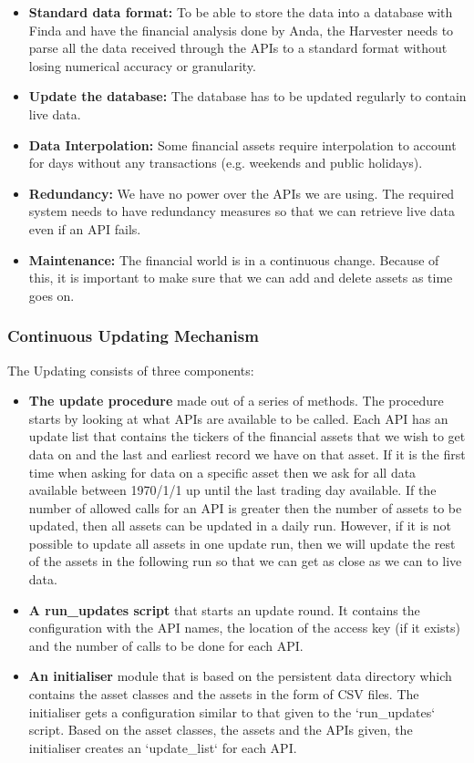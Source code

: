 \documentclass[main.tex]{subfiles}
\begin{document}
\begin{itemize}
    \item \textbf{Standard data format:} To be able to store the data into a database with Finda and have the financial analysis done by Anda, the Harvester needs to parse all the data received through the APIs to a standard format without losing numerical accuracy or granularity.
    \item \textbf{Update the database:} The database has to be updated regularly to contain live data.
    \item \textbf{Data Interpolation:} Some financial assets require interpolation to account for days without any transactions (e.g. weekends and public holidays).
    \item \textbf{Redundancy:} We have no power over the APIs we are using. The required system needs to have redundancy measures so that we can retrieve live data even if an API fails.
    \item \textbf{Maintenance:} The financial world is in a continuous change. Because of this, it is important to make sure that we can add and delete assets as time goes on.
\end{itemize}

\subsubsection{Continuous Updating Mechanism}
The Updating consists of three components:
\begin{itemize}
    \item \textbf{The update procedure} made out of a series of methods. The procedure starts by looking at what APIs are available to be called. Each API has an update list that contains the tickers of the financial assets that we wish to get data on and the last and earliest record we have on that asset. If it is the first time when asking for data on a specific asset then we ask for all data available between 1970/1/1 up until the last trading day available. If the number of allowed calls for an API is greater then the number of assets to be updated, then all assets can be updated in a daily run. However, if it is not possible to update all assets in one update run, then we will update the rest of the assets in the following run so that we can get as close as we can to live data.
    \item \textbf{A run\_updates script} that starts an update round. It contains the configuration with the API names, the location of the access key (if it exists) and the number of calls to be done for each API.
    \item \textbf{An initialiser} module that is based on the persistent data directory which contains the asset classes and the assets in the form of CSV files. The initialiser gets a configuration similar to that given to the `run\_updates` script. Based on the asset classes, the assets and the APIs given, the initialiser creates an `update\_list` for each API.
\end{itemize}
\end{document}
